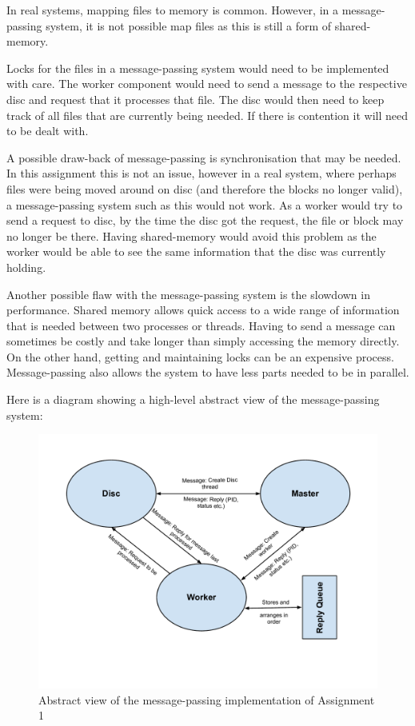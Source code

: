 \documentclass[12pt]{article}
\begin{document}
In real systems, mapping files to memory is common. However, in a message-passing system, it is not possible map files as this is still a form of shared-memory.

Locks for the files in a message-passing system would need to be implemented with care. The worker component would need to send a message to the respective disc and request that it processes that file. The disc would then need to keep track of all files that are currently being needed. If there is contention it will need to be dealt with. 

A possible draw-back of message-passing is synchronisation that may be needed. In this assignment this is not an issue, however in a real system, where perhaps files were being moved around on disc (and therefore the blocks no longer valid), a message-passing system such as this would not work. As a worker would try to send a request to disc, by the time the disc got the request, the file or block may no longer be there. Having shared-memory would avoid this problem as the worker would be able to see the same information that the disc was currently holding.

Another possible flaw with the message-passing system is the slowdown in performance. Shared memory allows quick access to a wide range of information that is needed between two processes or threads. Having to send a message can sometimes be costly and take longer than simply accessing the memory directly. On the other hand, getting and maintaining locks can be an expensive process. Message-passing also allows the system to have less parts needed to be in parallel.

Here is a diagram showing a high-level abstract view of the message-passing system:

\begin{figure}
\centering
\includegraphics[width=18cm]{message-passing.pdf}
\caption{Abstract view of the message-passing implementation of Assignment 1}
\label{fig:message-passing}
\end{figure}
\end{document}
